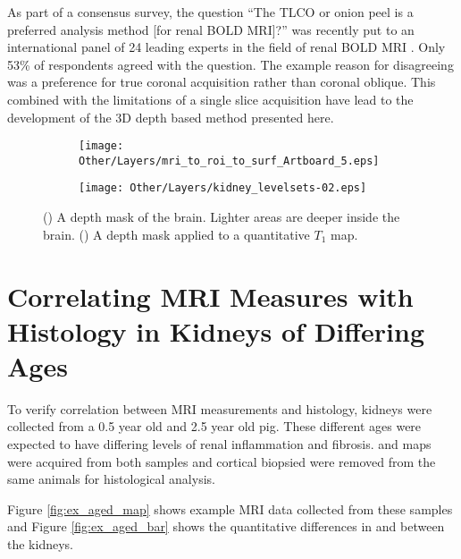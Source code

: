 As part of a consensus survey, the question ``The \ac{TLCO} or onion peel is a preferred analysis method [for renal \ac{BOLD} \ac{MRI}]?'' was recently put to an international panel of 24 leading experts in the field of renal \ac{BOLD} \ac{MRI} \cite{bane_consensus-based_2020}. Only 53\% of respondents agreed with the question. The example reason for disagreeing was a preference for true coronal acquisition rather than coronal oblique. This combined with the limitations of a single slice acquisition have lead to the development of the 3D depth based method presented here.
\begin{figure}[H]
	\centering
	\begin{subfigure}[c]{0.47\textwidth}
		\centering
		\texttt{[image: Other/Layers/mri\_to\_roi\_to\_surf\_Artboard\_5.eps]}
		\caption{}
		\label{fig:ex_layers_brain}
	\end{subfigure}
	\hfill
	\begin{subfigure}[c]{0.47\textwidth}
		\centering
		\texttt{[image: Other/Layers/kidney\_levelsets-02.eps]}
		\caption{}
		\label{fig:ex_layers_kidney}
	\end{subfigure}
	\caption{() A depth mask of the brain. Lighter areas are deeper inside the brain. () A depth mask applied to a quantitative $T_1$ map.}
	\label{fig:ex_layers_example}
\end{figure}


\section{Correlating MRI Measures with Histology in Kidneys of Differing Ages}
To verify correlation between \ac{MRI} measurements and histology, kidneys were collected from a 0.5 year old and 2.5 year old pig. These different ages were expected to have differing levels of renal inflammation and fibrosis. \tone and \ttwostar maps were acquired from both samples and cortical biopsied were removed from the same animals for histological analysis. 

Figure \ref{fig:ex_aged_map} shows example \ac{MRI} data collected from these samples and Figure \ref{fig:ex_aged_bar} shows the quantitative differences in \tone and \ttwo between the kidneys. 

